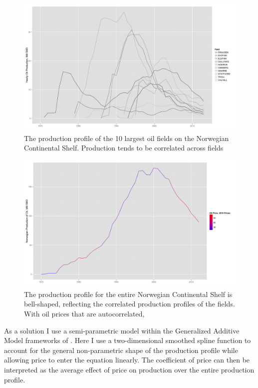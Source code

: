 \documentclass[12pt]{article}
\begin{document}
\begin{figure}
	\includegraphics[width=1\textwidth]{figures/top10_production_print.png}
	\caption{The production profile of the 10 largest oil fields on the Norwegian Continental Shelf.  Production tends to be correlated across fields}
	\label{top10_production}	
	\end{figure}

\begin{figure}
	\includegraphics[width=1\textwidth]{figures/oil_decline_print.png}
	\caption{The production profile for the entire Norwegian Continental Shelf is bell-shaped, reflecting the correlated production profiles of the fields.  With oil prices that are autocorrelated, }
	\label{oil_decline}
\end{figure}

As a solution I use a semi-parametric model within the Generalized Additive Model frameworks of \cite{hastie_generalized_1990}.  Here I use a two-dimensional smoothed spline function to account for the general non-parametric shape of the production profile while allowing price to enter the equation linearly.  The coefficient of price can then be interpreted as the average effect of price on production over the entire production profile.
\end{document}
